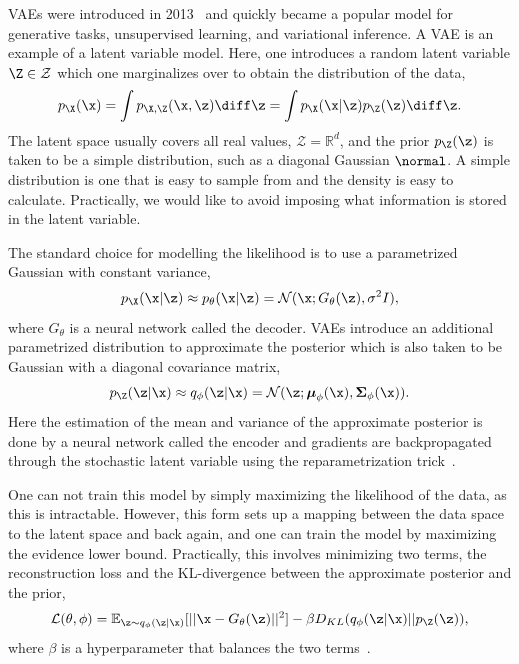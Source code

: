 VAEs were introduced in 2013~\cite{AutoEncodingVariationalBayes} and quickly became a popular model for generative tasks, unsupervised learning, and variational inference.
A VAE is an example of a latent variable model.
Here, one introduces a random latent variable $\Z \in \mathcal{Z}$ which one marginalizes over to obtain the distribution of the data,
\begin{equation}
    p_\X(\x) = \int p_{\X,\Z}(\x, \z)\diff\z = \int p_\X(\x|\z)p_\Z(\z)\diff\z.
\end{equation}
The latent space usually covers all real values, $\mathcal{Z} = \mathbb{R}^d$, and the prior $p_\Z(\z)$ is taken to be a simple distribution, such as a diagonal Gaussian $\normal$.
A simple distribution is one that is easy to sample from and the density is easy to calculate.
Practically, we would like to avoid imposing what information is stored in the latent variable.

The standard choice for modelling the likelihood is to use a parametrized Gaussian with constant variance,
\begin{equation}
    p_\X(\x|\z) \approx p_{\theta}(\x|\z) = \mathcal{N}(\x; G_{\theta}(\z), \sigma^2 I),
\end{equation}
where $G_{\theta}$ is a neural network called the decoder.
VAEs introduce an additional parametrized distribution to approximate the posterior which is also taken to be Gaussian with a diagonal covariance matrix,
\begin{equation}
    p_\Z(\z|\x) \approx q_\phi(\z|\x) = \mathcal{N}(\z; \boldsymbol{\mu}_\phi(\x), \boldsymbol{\Sigma}_\phi(\x)).
\end{equation}
Here the estimation of the mean and variance of the approximate posterior is done by a neural network called the encoder and gradients are backpropagated through the stochastic latent variable using the reparametrization trick~\cite{AutoEncodingVariationalBayes}.

One can not train this model by simply maximizing the likelihood of the data, as this is intractable.
However, this form sets up a mapping between the data space to the latent space and back again, and one can train the model by maximizing the evidence lower bound.
Practically, this involves minimizing two terms, the reconstruction loss and the KL-divergence between the approximate posterior and the prior,
\begin{equation}
    \mathcal{L}(\theta, \phi) = \mathbb{E}_{\z \sim q_{\phi}(\z|\x)}[||\x - G_{\theta}(\z)||^2] - \beta D_{KL}(q_{\phi}(\z|\x) || p_\Z(\z)),
\end{equation}
where $\beta$ is a hyperparameter that balances the two terms~\cite{BetaVAE}.

